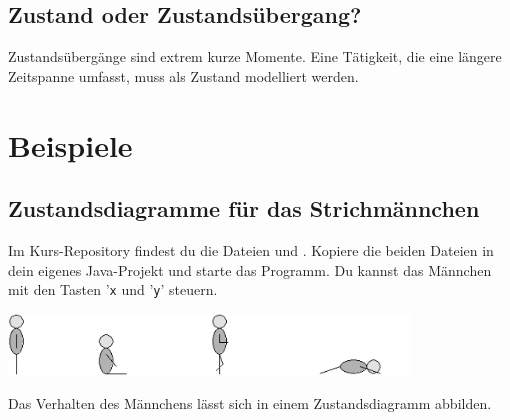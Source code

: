 \subsection{Zustand oder Zustandsübergang?}

Zustandsübergänge sind extrem kurze Momente. Eine Tätigkeit, die eine längere
Zeitspanne umfasst, muss als Zustand modelliert werden.


\section{Beispiele}

\subsection{Zustandsdiagramme für das Strichmännchen}

Im Kurs-Repository findest du die Dateien  und
. Kopiere die beiden Dateien in dein eigenes Java-Projekt und
starte das Programm. Du kannst das Männchen mit den Tasten '\lstinline|x| und
'\lstinline|y|' steuern.

\begin{center}
\includegraphics[width=0.8\textwidth]{./inf/SEKII/11_UML_Zustandsdiagramme/maennchen.png}
\end{center}

Das Verhalten des Männchens lässt sich in einem Zustandsdiagramm abbilden.


